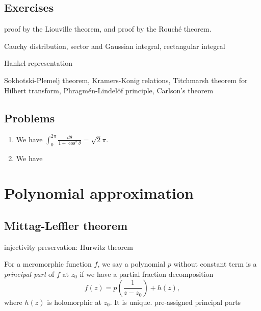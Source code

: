 \documentclass{../note}
\begin{document}
\section*{Exercises}
\begin{prb}
proof by the Liouville theorem, and proof by the Rouch\'e theorem.
\end{prb}
\begin{prb}
Cauchy distribution,
sector and Gaussian integral,
rectangular integral
\end{prb}
\begin{prb}
\end{prb}
\begin{prb}
Hankel representation
\end{prb}
\begin{prb}
\end{prb}

Sokhotski-Plemelj theorem,
Kramers-Konig relations,
Titchmarsh theorem for Hilbert transform,
Phragm\'en-Lindel\"of principle,
Carlson's theorem

\section*{Problems}
\begin{enumerate}
\item We have $\int_0^{2\pi}\frac{d\theta}{1+\cos^2\theta}=\sqrt2\pi$.
\item We have
\[\]
\end{enumerate}




\chapter{Polynomial approximation}
\section{Mittag-Leffler theorem}
\begin{prb}
\begin{parts}
\item injectivity preservation: Hurwitz theorem
\end{parts}
\end{prb}
\begin{prb}
For a meromorphic function $f$, we say a polynomial $p$ without constant term is a \emph{principal part} of $f$ at $z_0$ if we have a partial fraction decomposition
\[f(z)=p\left(\frac1{z-z_0}\right)+h(z),\]
where $h(z)$ is holomorphic at $z_0$.
It is unique.
pre-assigned principal parts
\end{prb}
\end{document}
